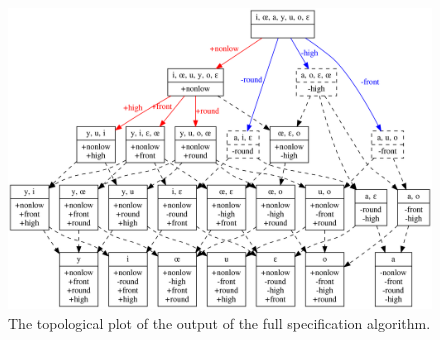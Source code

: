 \documentclass[11pt, oneside]{article}   	%
\begin{document}
\begin{figure}[htb!]
\centering
\includegraphics[width=\textwidth]{vowel_inventory_full_TOPOLOGICAL.png}
\caption{The topological plot of the output of the full specification algorithm.}
\label{fig:vowelfulltopological}
\end{figure}



\end{document}
